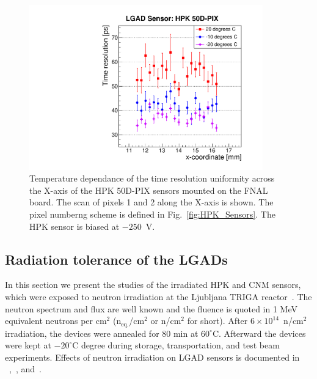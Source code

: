 \documentclass[preprint,1p]{elsarticle}
\begin{document}
\begin{figure}[htbp] 
\centering
\includegraphics[width=0.9\textwidth]{figs/FNAL_TimeResolution_vs_X_HPK50D_TemperatureDependance.pdf} 
\caption{Temperature dependance of the time resolution uniformity across the
X-axis of the HPK 50D-PIX sensors mounted on the FNAL board. The scan of pixels
1 and 2 along the X-axis is shown. The pixel numberng scheme is defined in
Fig.~\ref{fig:HPK_Sensors}. The HPK sensor is biased at $-250$~V.} 
\label{fig:TimeResolution_vs_X_HPK50D_TemperatureDependance} 
\end{figure} 




\subsection{Radiation tolerance of the LGADs}
\label{sec:rad_tolerance}

In this section we present the studies of the irradiated HPK and CNM sensors,
which were exposed to neutron irradiation at the Ljubljana TRIGA reactor~\cite{SNOJ2012483}. The
neutron spectrum and flux are well known and the fluence is quoted in 1 MeV
equivalent neutrons per cm$^2$ (n$_{\mathrm{eq.}}$/cm$^2$ or 
n/cm$^2$ for short). After $6\times 10^{14}$~n/cm$^2$ irradiation, the devices
were
annealed for 80 min at $60^{\circ}$C. Afterward the devices were kept at
$-20^{\circ}$C degree during storage, transportation, and test beam experiments.
Effects of neutron irradiation on LGAD sensors is documented in
~\cite{Galloway:2017gfx},~\cite{4DTracking}, and~\cite{Kramberger}.
\end{document}
